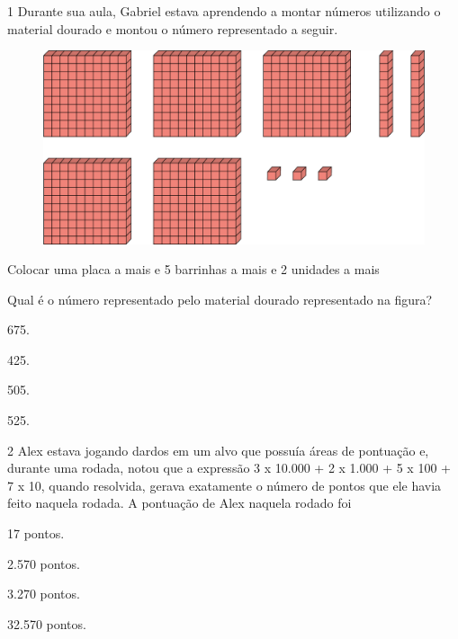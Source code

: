
\num{1} Durante sua aula, Gabriel estava aprendendo a montar números utilizando o
material dourado e montou o número representado a seguir.

\begin{figure}[htpb!]
\centering
\includegraphics[width=\textwidth]{media/image76.png}
\end{figure}

Colocar uma placa a mais e 5 barrinhas a mais e 2 unidades a mais

Qual é o número representado pelo material dourado representado na figura?

\begin{escolha}
\item
  675.
\item
  425.
\item
  505.
\item
  525.
\end{escolha}


\num{2} Alex estava jogando dardos em um alvo que possuía áreas de pontuação e,
durante uma rodada, notou que a expressão 3 x 10.000 + 2 x 1.000 + 5 x
100 + 7 x 10, quando resolvida, gerava exatamente o número de pontos que
ele havia feito naquela rodada. A pontuação de Alex naquela rodado foi

\begin{multicols}{2}
\begin{escolha}
\item
  17 pontos.
\item
  2.570 pontos.
\item
  3.270 pontos.
\item
  32.570 pontos.
\end{escolha}
\end{multicols}

